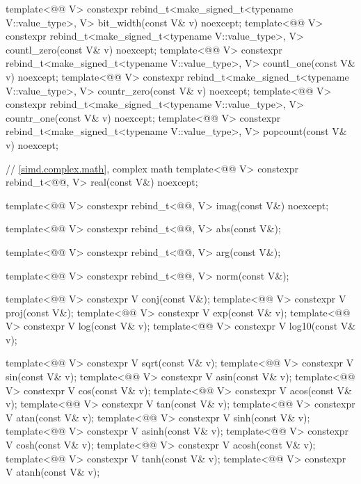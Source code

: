 \begin{codeblock}
{  template<@@ V>
    constexpr rebind_t<make_signed_t<typename V::value_type>, V>
      bit_width(const V& v) noexcept;
  template<@@ V>
    constexpr rebind_t<make_signed_t<typename V::value_type>, V>
      countl_zero(const V& v) noexcept;
  template<@@ V>
    constexpr rebind_t<make_signed_t<typename V::value_type>, V>
      countl_one(const V& v) noexcept;
  template<@@ V>
    constexpr rebind_t<make_signed_t<typename V::value_type>, V>
      countr_zero(const V& v) noexcept;
  template<@@ V>
    constexpr rebind_t<make_signed_t<typename V::value_type>, V>
      countr_one(const V& v) noexcept;
  template<@@ V>
    constexpr rebind_t<make_signed_t<typename V::value_type>, V>
      popcount(const V& v) noexcept;

  // \ref{simd.complex.math},  complex math
  template<@@ V>
    constexpr rebind_t<@@, V> real(const V&) noexcept;

  template<@@ V>
    constexpr rebind_t<@@, V> imag(const V&) noexcept;

  template<@@ V>
    constexpr rebind_t<@@, V> abs(const V&);

  template<@@ V>
    constexpr rebind_t<@@, V> arg(const V&);

  template<@@ V>
    constexpr rebind_t<@@, V> norm(const V&);

  template<@@ V> constexpr V conj(const V&);
  template<@@ V> constexpr V proj(const V&);
  template<@@ V> constexpr V exp(const V& v);
  template<@@ V> constexpr V log(const V& v);
  template<@@ V> constexpr V log10(const V& v);

  template<@@ V> constexpr V sqrt(const V& v);
  template<@@ V> constexpr V sin(const V& v);
  template<@@ V> constexpr V asin(const V& v);
  template<@@ V> constexpr V cos(const V& v);
  template<@@ V> constexpr V acos(const V& v);
  template<@@ V> constexpr V tan(const V& v);
  template<@@ V> constexpr V atan(const V& v);
  template<@@ V> constexpr V sinh(const V& v);
  template<@@ V> constexpr V asinh(const V& v);
  template<@@ V> constexpr V cosh(const V& v);
  template<@@ V> constexpr V acosh(const V& v);
  template<@@ V> constexpr V tanh(const V& v);
  template<@@ V> constexpr V atanh(const V& v);

}
\end{codeblock}
